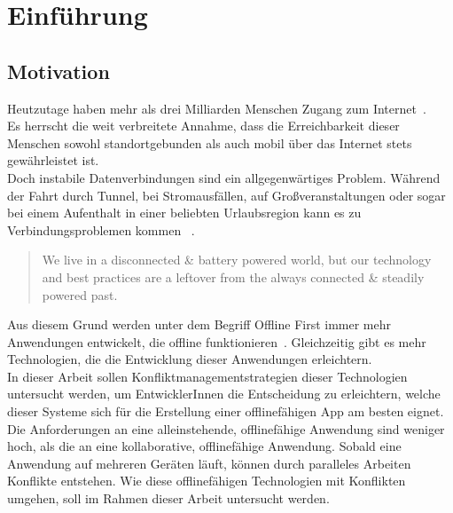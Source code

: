 \chapter{\label{chap:einleitung}Einführung}
\section{Motivation}

Heutzutage haben mehr als drei Milliarden Menschen Zugang zum Internet~\cite{dev-report}.\\
Es herrscht die weit verbreitete Annahme, dass die Erreichbarkeit dieser Menschen sowohl standortgebunden als auch mobil über das Internet stets gewährleistet ist.\\
Doch instabile Datenverbindungen sind ein allgegenwärtiges Problem. Während der Fahrt durch Tunnel, bei Stromausfällen, auf Großveranstaltungen oder sogar bei einem Aufenthalt in einer beliebten Urlaubsregion kann es zu Verbindungsproblemen kommen ~\cite{offline_ux, ndr}.\vspace{0.3cm}
\begin{quote}
	We live in a disconnected \& battery powered world, but our technology and best practices are a leftover from the always connected \& steadily powered past.
	\cite{offlinefirst}\vspace{0.3cm}
\end{quote}
%
Aus diesem Grund werden unter dem Begriff Offline First immer mehr Anwendungen entwickelt, die offline funktionieren~\cite{heise}.
Gleichzeitig gibt es mehr Technologien, die die Entwicklung dieser Anwendungen erleichtern.\\
%
In dieser Arbeit sollen Konfliktmanagementstrategien dieser Technologien untersucht werden, um EntwicklerInnen die Entscheidung zu erleichtern, welche dieser Systeme sich für die Erstellung einer offlinefähigen \gls{App} am besten eignet.
%
Die Anforderungen an eine alleinstehende, offlinefähige Anwendung sind weniger hoch, als die an eine kollaborative, offlinefähige Anwendung.
Sobald eine Anwendung auf mehreren Geräten läuft, können durch paralleles Arbeiten Konflikte entstehen.
Wie diese offlinefähigen Technologien mit Konflikten umgehen, soll im Rahmen dieser Arbeit untersucht werden.
%
%
\clearpage
